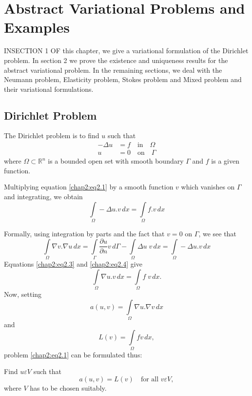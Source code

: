 
\chapter{Abstract Variational Problems and Examples}\label{chap2}

IN\pageoriginale SECTION 1 OF this chapter, we give a variational
formulation of the Dirichlet problem. In section 2 we prove the
existence and uniqueness results for the abstract variational
problem. In the remaining sections, we deal with the Neumann problem,
Elasticity problem, Stokes problem and Mixed problem and their
variational formulations.

\section{Dirichlet Problem}\label{chap2:ssec2.1} 
The Dirichlet problem is to find $u$ such that 
\begin{align}\label{chap2:eq2.1}
-\Delta u &= f \quad \text{in} \quad \Omega \\
u &= 0 \quad \text{on} \quad \Gamma \label{chap2:eq2.2}
\end{align}
where $\Omega \subset \mathbb{R}^n$ is a bounded open set with smooth
boundary $\Gamma$ and $f$ is a given function. 

Multiplying equation \eqref{chap2:eq2.1} by a smooth function $v$
which vanishes on $\Gamma$ and integrating, we obtain 
\begin{equation}\label{chap2:eq2.3}
\int\limits_\Omega -\Delta u.v \,dx = \int\limits_\Omega f.v \,dx
\end{equation}

Formally, using integration by parts and the fact that $v=0$ on
$\Gamma$, we see that 
\begin{equation}\label{chap2:eq2.4}
\int\limits_\Omega\nabla v.\nabla u \,dx=\int\limits_\Gamma\frac{\partial
  u}{\partial n}v \, d\Gamma - \int\limits_\Omega\Delta u \; v \,dx=
\int\limits_\Omega -\Delta u.v \,dx 
\end{equation}
Equations \eqref{chap2:eq2.3} and \eqref{chap2:eq2.4} give 
$$
\int\limits_\Omega \nabla u.v \,dx=\int\limits_\Omega f\; v\,dx.
$$
Now, setting 
$$
a(u, v)=\int\limits_\Omega \nabla u.\nabla v \,dx
$$\pageoriginale
and 
$$
L(v)=\int\limits_\Omega fv \,dx,
$$
problem \eqref{chap2:eq2.1} can be formulated thus:

\noindent Find $u \varepsilon V$ such that 
\begin{equation}\label{chap2:eq2.5}
a(u, v)=L(v) \quad \text{for all }  v \varepsilon V,
\end{equation}
where $V$ has to be chosen suitably.

